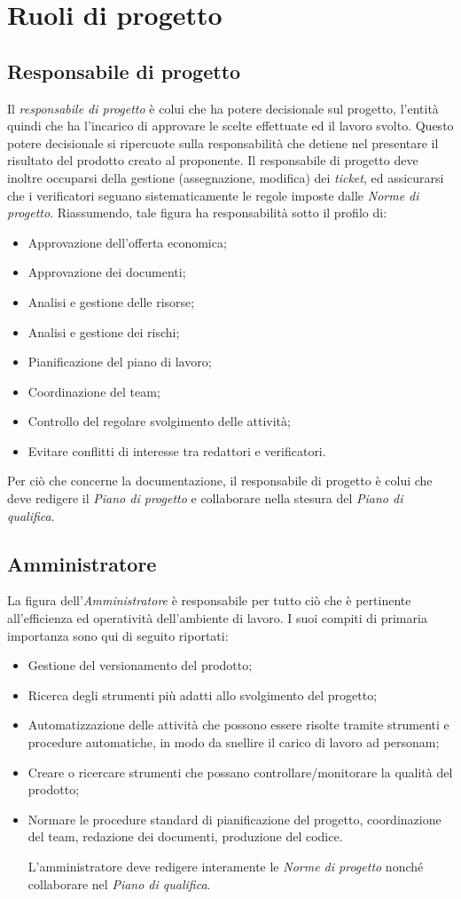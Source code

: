 \section{Ruoli di progetto}
\subsection{Responsabile di progetto}
Il \textit{responsabile di progetto} è colui che ha potere decisionale sul progetto, l'entità quindi che ha l'incarico di approvare le scelte effettuate ed il lavoro svolto. Questo potere decisionale si ripercuote sulla responsabilità che detiene nel presentare il risultato del prodotto creato al proponente.
Il responsabile di progetto deve inoltre occuparsi della gestione (assegnazione, modifica) dei \textit{ticket}, ed assicurarsi che i verificatori seguano sistematicamente le regole imposte dalle \textit{Norme di progetto}.
Riassumendo, tale figura ha responsabilità sotto il profilo di:
\begin{itemize}
\item Approvazione dell'offerta economica;
\item Approvazione dei documenti;
\item Analisi e gestione delle risorse;
\item Analisi e gestione dei rischi;
\item Pianificazione del piano di lavoro;
\item Coordinazione del team;
\item Controllo del regolare svolgimento delle attività;
\item Evitare conflitti di interesse tra redattori e verificatori.
\end{itemize}
Per ciò che concerne la documentazione, il responsabile di progetto è colui che deve redigere il \textit{Piano di progetto} e collaborare nella stesura del \textit{Piano di qualifica}.
\subsection{Amministratore}
La figura dell'\textit{Amministratore} è responsabile per tutto ciò che è pertinente all'efficienza ed operatività dell'ambiente di lavoro. 
I suoi compiti di primaria importanza sono qui di seguito riportati:
\begin{itemize}
\item Gestione del versionamento del prodotto;
\item Ricerca degli strumenti più adatti allo svolgimento del progetto;
\item Automatizzazione delle attività che possono essere risolte tramite strumenti e procedure automatiche, in modo da snellire il carico di lavoro ad personam;
\item Creare o ricercare strumenti che possano controllare/monitorare la qualità del prodotto;
\item Normare le procedure standard di pianificazione del progetto, coordinazione del team, redazione dei documenti, produzione del codice.

L'amministratore deve redigere interamente le \textit{Norme di progetto} nonché collaborare nel \textit{Piano di qualifica}.
\end{itemize}
